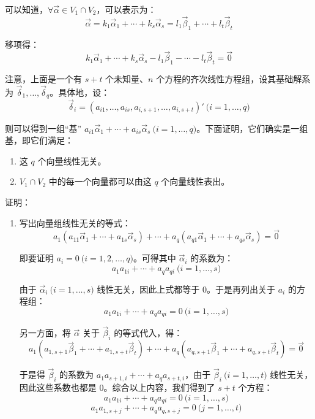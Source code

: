 \begin{solve}
	可以知道，$\forall \vec \alpha \in V_1 \cap V_2$，可以表示为：
	$$
	\vec \alpha = k_1 \vec \alpha_1 + \cdots + k_s \vec \alpha_s = l_1 \vec \beta_1 + \cdots + l_t \vec \beta_t
	$$

	移项得：
	$$
	k_1 \vec \alpha_1 + \cdots + k_s \vec \alpha_s - l_1 \vec \beta_1 - \cdots - l_t \vec \beta_t = \vec 0
	$$

	注意，上面是一个有 $s + t$ 个未知量、$n$ 个方程的齐次线性方程组，设其基础解系为 $\vec \delta_1, \ldots, \vec \delta_q$。具体地，设：
	$$
	\vec \delta_i = (a_{i1}, \ldots, a_{is}, a_{i, s + 1}, \ldots, a_{i, s + t})' \pod{i = 1, \ldots, q}
	$$

	则可以得到一组“基” $a_{i1} \vec \alpha_1 + \cdots + a_{is} \vec \alpha_s \pod{i = 1, \ldots, q}$。下面证明，它们确实是一组基，即它们满足：
	\begin{enumerate}
		\item 这 $q$ 个向量线性无关。
		\item $V_1 \cap V_2$ 中的每一个向量都可以由这 $q$ 个向量线性表出。
	\end{enumerate}

	证明：
	\begin{enumerate}
		\item 写出向量组线性无关的等式：
		$$
		a_1 (a_{11} \vec \alpha_1 + \cdots + a_{1s} \vec \alpha_s) + \cdots + a_q(a_{q1} \vec \alpha_1 + \cdots + a_{qs} \vec \alpha_s) = \vec 0
		$$

		即要证明 $a_i = 0 \pod{i = 1, 2, \ldots, q}$。可得其中 $\vec \alpha_i$ 的系数为：
		$$
		a_1 a_{1i} + \cdots + a_q a_{qi} \pod{i = 1, \ldots, s}
		$$

		由于 $\vec \alpha_i \pod{i = 1, \ldots, s}$ 线性无关，因此上式都等于 $0$。于是再列出关于 $a_i$ 的方程组：
		$$
		a_1 a_{1i} + \cdots + a_q a_{qi} = 0 \pod{i = 1, \ldots, s}
		$$

		另一方面，将 $\vec \alpha$ 关于 $\vec \beta_i$ 的等式代入，得：
		$$
		a_1(a_{1, s + 1} \vec \beta_1 + \cdots + a_{1, s + t} \vec \beta_t) + \cdots + a_q(a_{q, s + 1} \vec \beta_1 + \cdots + a_{q, s + t} \vec \beta_t) = \vec 0
		$$

		于是得 $\vec \beta_i$ 的系数为 $a_1 a_{s + 1, i} + \cdots + a_q a_{s + t, i}$，由于 $\vec \beta_i \pod{i = 1, \ldots, t}$ 线性无关，因此这些系数也都是 $0$。综合以上内容，我们得到了 $s + t$ 个方程：
		$$
		a_1 a_{1i} + \cdots + a_q a_{qi} = 0 \pod{i = 1, \ldots, s}
		$$$$
		a_1 a_{1, s + j} + \cdots + a_q a_{q, s + j} = 0 \pod{j = 1, \ldots, t}
		$$


\end{enumerate}
\end{solve}

